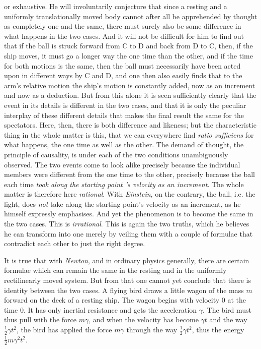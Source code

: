 \documentclass[12pt,a4paper]{article}
\begin{document}
or exhaustive. He will involuntarily conjecture that since a resting and a
uniformly translationally moved body cannot after all be apprehended by
thought as completely one and the same, there must surely also be some
difference in what happens in the two cases. And it will not be difficult for
him to find out that if the ball is struck forward from C to D and back from D
to C, then, if the ship moves, it must go a longer way the one time than the
other, and if the time for both motions is the same, then the ball must
necessarily have been acted upon in different ways by C and D, and one then
also easily finds that to the arm's relative motion the ship's motion is
constantly added, now as an increment and now as a deduction. But from this
alone it is seen sufficiently clearly that the event in its details is
different in the two cases, and that it is only the peculiar interplay of
these different details that makes the final result the same for the
spectators. Here, then, there is both difference and likeness; but the
characteristic thing in the whole matter is this, that we can everywhere find
\textit{ratio sufficiens} for what happens, the one time as well as the other.
The demand of thought, the principle of causality, is under each of the two
conditions unambiguously observed. The two events come to look alike precisely
because the individual members were different from the one time to the other,
precisely because the ball each time \emph{took along the starting
point\-%
's velocity as an increment}. The whole matter is therefore here
\emph{rational}. With \emph{Einstein}, on the contrary, the ball, i.e. the
light, does \emph{not} take along the starting point's velocity as an
increment, as he himself expressly emphasises. And yet the phenomenon is to
become the same in the two cases. This is \emph{irrational}. This is again the
two truths, which he believes he can transform into one merely by veiling them
with a couple of formulae that contradict each other to just the right degree.

It is true that with \emph{Newton}, and in ordinary physics generally, there
are certain formulae which can remain the same in the resting and in the
uniformly rectilinearly moved system. But from that one cannot yet conclude
that there is identity between the two cases. A flying bird draws a little
wagon of the mass $m$ forward on the deck of a resting ship. The wagon begins
with velocity 0 at the time 0. It has only inertial resistance and gets the
acceleration $\gamma$. The bird must thus pull with the force $m\gamma$, and
when the velocity has become $\gamma t$ and the way
$\tfrac{1}{2}\gamma t^{2}$, the bird has applied the force $m\gamma$ through
the way $\tfrac{1}{2}\gamma t^{2}$, thus the energy
$\tfrac{1}{2}m\gamma^{2}t^{2}$.
\end{document}
